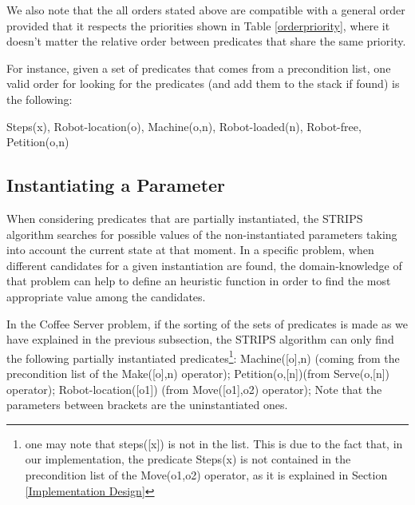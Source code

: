 \documentclass[12pt,a4paper,oneside]{article}
\numberwithin{equation}{section}
\numberwithin{equation}{section}
\theoremstyle{definition}
\begin{document}
We also note that the all orders stated above are compatible with a general order provided that it respects the priorities shown in Table \ref{orderpriority}, where it doesn’t matter the relative order between predicates that share the same priority. 

\begin{table}[]
\centering
{}
\caption{Preferences that must satisfy a general order.}
\label{orderpriority}
\end{table}

For instance, given a set of predicates that comes from a precondition list, one valid order for looking for the predicates (and add them to the stack if found) is the following:

Steps(x), Robot-location(o), Machine(o,n), Robot-loaded(n), Robot-free, Petition(o,n)


\subsection{Instantiating a Parameter} \label{Instantiating a Parameter}

When considering predicates that are partially instantiated, the STRIPS algorithm searches for possible values of the non-instantiated parameters taking into account the current state at that moment. In a specific problem, when different candidates for a given instantiation are found, the domain-knowledge of that problem can help to define an heuristic function in order to find the most appropriate value among the candidates.


In the Coffee Server problem, if the sorting of the sets of predicates is made as we have explained in the previous subsection, the STRIPS algorithm can only find the following partially instantiated predicates\footnote{one may note that steps([x]) is not in the list. This is due to the fact that, in our implementation, the predicate Steps(x) is not contained in the precondition list of the Move(o1,o2) operator, as it is explained in Section \ref{Implementation Design}}:
Machine([o],n) (coming from the precondition list of the Make([o],n) operator);
Petition(o,[n])(from Serve(o,[n]) operator);
Robot-location([o1]) (from Move([o1],o2) operator);
Note that the parameters between brackets are the uninstantiated ones.
\end{document}
